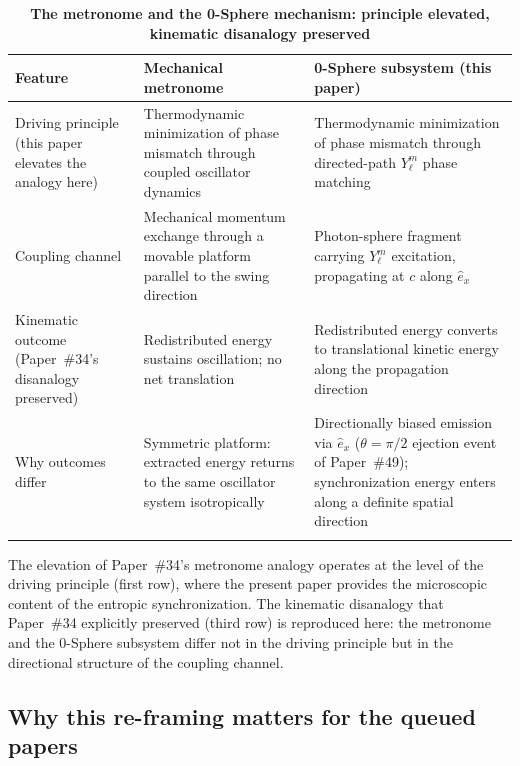 \documentclass[%
 reprint, amsmath,amssymb, aps, prb, ]{revtex4-2}
\numberwithin{equation}{section}
\newcommand{\iphase}{\theta}
\newcommand{\ehat}[1]{\hat{e}_{#1}}
\begin{document}
\begin{table}[t!]
\centering
\caption{\textbf{The metronome and the 0-Sphere mechanism: principle elevated, kinematic disanalogy preserved}}
\label{tab:metronome_vs_0sm}
\renewcommand{\arraystretch}{1.4}
\begin{tabular}{p{4.0cm}p{5.5cm}p{6.0cm}}
\toprule
\textbf{Feature} & \textbf{Mechanical metronome} & \textbf{0-Sphere subsystem (this paper)} \\
\midrule
Driving principle (this paper elevates the analogy here)
& Thermodynamic minimization of phase mismatch through coupled oscillator dynamics
& Thermodynamic minimization of phase mismatch through directed-path $Y_\ell^m$ phase matching \\
\addlinespace[0.3cm]
Coupling channel
& Mechanical momentum exchange through a movable platform parallel to the swing direction
& Photon-sphere fragment carrying $Y_\ell^m$ excitation, propagating at $c$ along $\ehat{x}$ \\
\addlinespace[0.3cm]
Kinematic outcome (Paper~\#34's disanalogy preserved)
& Redistributed energy sustains oscillation; no net translation
& Redistributed energy converts to translational kinetic energy along the propagation direction \\
\addlinespace[0.3cm]
Why outcomes differ
& Symmetric platform: extracted energy returns to the same oscillator system isotropically
& Directionally biased emission via $\ehat{x}$ ($\iphase = \pi/2$ ejection event of Paper~\#49); synchronization energy enters along a definite spatial direction \\
\addlinespace[0.2cm]
\bottomrule
\end{tabular}
\vspace{0.2cm}
\begin{minipage}{0.95\textwidth}
\justifying\footnotesize
The elevation of Paper~\#34's metronome analogy operates at the level of the driving principle (first row), where the present paper provides the microscopic content of the entropic synchronization. The kinematic disanalogy that Paper~\#34 explicitly preserved (third row) is reproduced here: the metronome and the 0-Sphere subsystem differ not in the driving principle but in the directional structure of the coupling channel.
\end{minipage}
\end{table}

\subsection{Why this re-framing matters for the queued papers}
\end{document}
